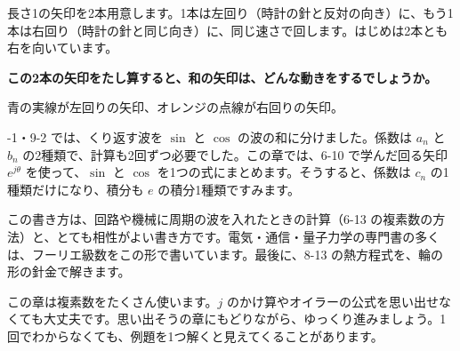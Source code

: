 \begin{hatena}
\noindent\begin{minipage}[c]{0.52\linewidth}
\raggedright
長さ1の矢印を2本用意します。1本は左回り（時計の針と反対の向き）に、もう1本は右回り（時計の針と同じ向き）に、同じ速さで回します。はじめは2本とも右を向いています。\par\vspace{4pt}
\textbf{この2本の矢印をたし算すると、和の矢印は、どんな動きをするでしょうか。}
\end{minipage}\hfill
\begin{minipage}[c]{0.45\linewidth}
\centering
{}\par\vspace{1pt}
{\footnotesize 青の実線が左回りの矢印、オレンジの点線が右回りの矢印。}
\end{minipage}
\end{hatena}

-1・9-2 では、くり返す波を $\sin$ と $\cos$ の波の和に分けました。係数は $a_n$ と $b_n$ の2種類で、計算も2回ずつ必要でした。この章では、6-10 で学んだ回る矢印 $e^{j\theta}$ を使って、$\sin$ と $\cos$ を1つの式にまとめます。そうすると、係数は $c_n$ の1種類だけになり、積分も $e$ の積分1種類ですみます。

この書き方は、回路や機械に周期の波を入れたときの計算（6-13 の複素数の方法）と、とても相性がよい書き方です。電気・通信・量子力学の専門書の多くは、フーリエ級数をこの形で書いています。最後に、8-13 の熱方程式を、輪の形の針金で解きます。

この章は複素数をたくさん使います。$j$ のかけ算やオイラーの公式を思い出せなくても大丈夫です。思い出そうの章にもどりながら、ゆっくり進みましょう。1回でわからなくても、例題を1つ解くと見えてくることがあります。

